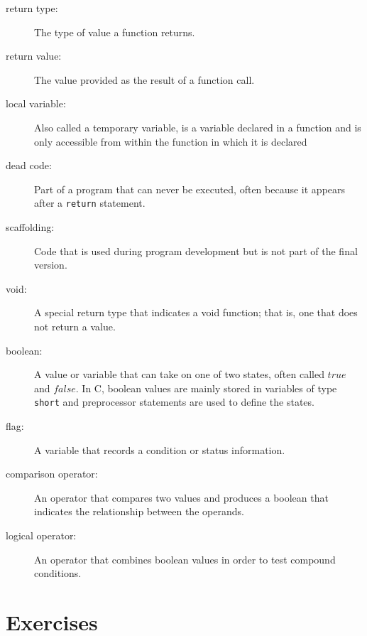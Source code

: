 \begin{description}

\item[return type:]  The type of value a function returns.

\item[return value:]  The value provided as the result of a function
call.

\item[local variable:]  Also called a temporary variable, is a variable declared in a function and is only accessible from within the function in which it is declared

\item[dead code:]  Part of a program that can never be executed,
often because it appears after a {\tt return} statement.

\item[scaffolding:]  Code that is used during program development
but is not part of the final version.

\item[void:]  A special return type that indicates a void function;
that is, one that does not return a value.

\item[boolean:]  A value or variable that can take on one of
two states, often called $true$ and $false$.  In C, boolean
values are mainly stored in variables of type {\tt short} and 
preprocessor statements are used to define the states.

\item[flag:]  A variable that records
a condition or status information.

\item[comparison operator:]  An operator that compares two values
and produces a boolean that indicates the relationship between the
operands.

\item[logical operator:]  An operator that combines boolean values
in order to test compound conditions.


\end{description}

\section{Exercises}
\setcounter{exercisenum}{0}




